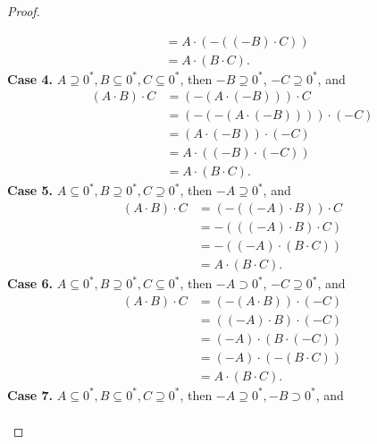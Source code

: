 \begin{proof}
\begin{enumerate}[label={(F\arabic*)}, start=4]
\begin{align*}
                                    & = A\cdot (-((-B)\cdot C)) \\
                                    & = A\cdot (B\cdot C).
              \end{align*}
              \textbf{Case 4.} $A\supseteq {0}^{*}, B\subseteq {0}^{*}, C\subseteq {0}^{*}$, then $-B\supseteq {0}^{*}$, $-C\supseteq {0}^{*}$, and
              \begin{align*}
                  (A\cdot B)\cdot C & = (-(A\cdot (-B)))\cdot C       \\
                                    & = (-(-(A\cdot (-B))))\cdot (-C) \\
                                    & = (A\cdot (-B))\cdot (-C)       \\
                                    & = A\cdot ((-B)\cdot (-C))       \\
                                    & = A\cdot (B\cdot C).
              \end{align*}
              \textbf{Case 5.} $A\subseteq {0}^{*}, B\supseteq {0}^{*}, C\supseteq {0}^{*}$, then $-A\supseteq {0}^{*}$, and
              \begin{align*}
                  (A\cdot B)\cdot C & = (-((-A)\cdot B))\cdot C \\
                                    & = -(((-A)\cdot B)\cdot C) \\
                                    & = -((-A)\cdot (B\cdot C)) \\
                                    & = A\cdot (B\cdot C).
              \end{align*}
              \textbf{Case 6.} $A\subseteq {0}^{*}, B\supseteq {0}^{*}, C\subseteq {0}^{*}$, then $-A\supset {0}^{*}$, $-C\supseteq {0}^{*}$, and
              \begin{align*}
                  (A\cdot B)\cdot C & = (-(A\cdot B))\cdot (-C) \\
                                    & = ((-A)\cdot B)\cdot (-C) \\
                                    & = (-A)\cdot (B\cdot (-C)) \\
                                    & = (-A)\cdot (-(B\cdot C)) \\
                                    & = A\cdot (B\cdot C).
              \end{align*}
              \textbf{Case 7.} $A\subseteq {0}^{*}, B\subseteq {0}^{*}, C\supseteq {0}^{*}$, then $-A\supseteq {0}^{*}, -B\supset {0}^{*}$, and
              \begin{align*}

\end{align*}
\end{enumerate}
\end{proof}
